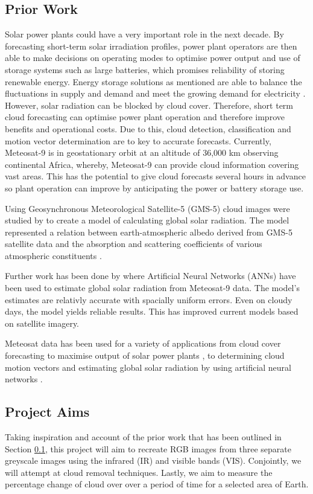 \subsection{Prior Work}\label{subsec1.3}

Solar power plants could have a very important role in the next decade. By forecasting short-term solar irradiation profiles, power plant operators are then able to make decisions on operating modes to optimise power output and use of storage systems such as large batteries, which promises reliability of storing renewable energy. Energy storage solutions as mentioned are able to balance the fluctuations in supply and demand and meet the growing demand for electricity \cite{joseph2006battery}. However, solar radiation can be blocked by cloud cover. Therefore, short term cloud forecasting can optimise power plant operation and therefore improve benefits and operational costs. Due to this, cloud detection, classification and motion vector determination are to key to accurate forecasts. Currently, Meteosat-9 is in geostationary orbit at an altitude of 36,000 km \cite{MS2G} observing continental Africa, whereby, Meteosat-9 can provide cloud information covering vast areas. This has the potential to give cloud forecasts several hours in advance so plant operation can improve by anticipating the power or battery storage use.
\par
Using Geosynchronous Meteorological Satellite-5 (GMS-5) cloud images were studied by \cite{janjai2009model} to create a model of calculating global solar radiation. The model represented a relation between earth-atmospheric albedo derived from GMS-5 satellite data and the absorption and scattering coefficients of various atmospheric constituents \cite{janjai2009model}.
\par
Further work has been done by \cite{globsol_NN} where Artificial Neural Networks (ANNs) have been used to estimate global solar radiation from Meteosat-9 data. The model's estimates are relativly accurate with spacially uniform errors. Even on cloudy days, the model yields reliable results. This has improved current models based on satellite imagery. \cite{janjai2009model}
\par
Meteosat data has been used for a variety of applications from cloud cover forecasting to maximise output of solar power plants \cite{cloud_forcast}, to determining cloud motion vectors \cite{cloudmotion} and estimating global solar radiation by using artificial neural networks \cite{globsol_NN}. 

\subsection{Project Aims}\label{subsec1.4}

Taking inspiration and account of the prior work that has been outlined in Section \ref{subsec1.3}, this project will aim to recreate RGB images from three separate greyscale images using the infrared (IR) and visible bands (VIS). Conjointly, we will attempt at cloud removal techniques. Lastly, we aim to measure the percentage change of cloud over over a period of time for a selected area of Earth.





